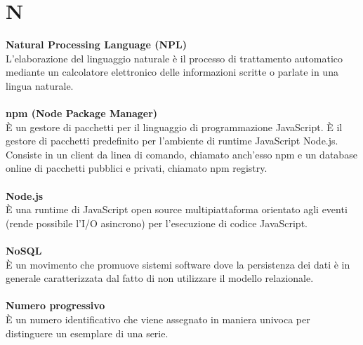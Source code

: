 \section{N}
\textbf{Natural Processing Language (NPL)}\\
L'elaborazione del linguaggio naturale è il processo di trattamento automatico mediante un calcolatore elettronico delle informazioni scritte o parlate in una lingua naturale. \\ \\
\textbf{npm (Node Package Manager)}\\
È un gestore di pacchetti per il linguaggio di programmazione JavaScript. È il gestore di pacchetti predefinito per l'ambiente di runtime JavaScript Node.js. 
Consiste in un client da linea di comando, chiamato anch'esso npm e un database online di pacchetti pubblici e privati, chiamato npm registry.\\ \\
\textbf{Node.js}\\
È una runtime di JavaScript open source multipiattaforma orientato agli eventi (rende possibile l’I/O asincrono) per l'esecuzione di codice JavaScript. \\ \\
\textbf{NoSQL}\\
È un movimento che promuove sistemi software dove la persistenza dei dati è in generale caratterizzata dal fatto di non utilizzare il modello relazionale. \\ \\
\textbf{Numero progressivo}\\ 
È un numero identificativo che viene assegnato in maniera univoca per distinguere un esemplare di una serie. \\ \\
\clearpage
